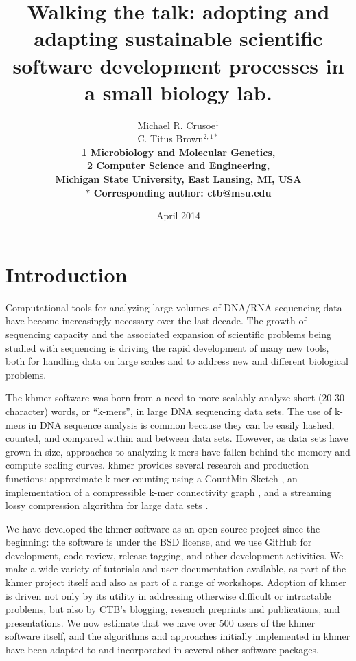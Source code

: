 \documentclass[11pt]{article}
\date{April 2014}
\title{Walking the talk: adopting and adapting sustainable scientific software
  development processes in a small biology lab.}
\author{Michael R. Crusoe$^{1}$\\
C. Titus Brown$^{2,1\ast}$\\
\small \bf{1} Microbiology and Molecular Genetics,\\
\small \bf{2} Computer Science and Engineering,\\
\small Michigan State University, East Lansing, MI, USA\\
\small $\ast$ Corresponding author: ctb@msu.edu}
\begin{document}
\maketitle



\setlength{\parindent}{0pt}
\setlength{\parindent}{0pt}
\setlength{\parskip}{0.70ex}

\section{Introduction}

Computational tools for analyzing large volumes of DNA/RNA sequencing data
have become increasingly necessary over the last decade.  The growth
of sequencing capacity and the associated expansion of scientific
problems being studied with sequencing is driving the rapid development of
many new tools, both for handling data on large scales and to address
new and different biological problems.

The khmer software was born from a need to more scalably analyze short
(20-30 character) words, or ``k-mers'', in large DNA sequencing data
sets. The use of k-mers in DNA sequence analysis is common because
they can be easily hashed, counted, and compared within and between
data sets.  However, as data sets have grown in size, approaches to
analyzing k-mers have fallen behind the memory and compute scaling
curves.  khmer provides several research and production functions:
approximate k-mer counting using a CountMin Sketch
\cite{Zhang2013}, an implementation of a compressible k-mer
connectivity graph \cite{Pell2012}, and a streaming lossy compression
algorithm for large data sets \cite{Brown2012}.

We have developed the khmer software as an open source project since
the beginning: the software is under the BSD license, and we use
GitHub for development, code review, release tagging, and other
development activities.  We make a wide variety of tutorials and
user documentation available, as part of the khmer project itself and
also as part of a range of workshops.  Adoption of khmer is driven not only by
its utility in addressing otherwise difficult or intractable problems,
but also by CTB's blogging, research preprints and publications, and
presentations.  We now estimate that we have over 500 users of the
khmer software itself, and the algorithms and approaches initially
implemented in khmer have been adapted to and incorporated in several other
software packages.
\end{document}
